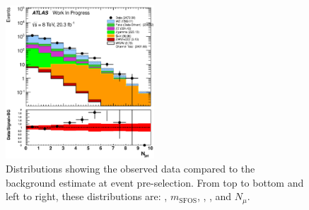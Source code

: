 \begin{figure}[htb]
\includegraphics[width=0.495\textwidth]{figures/appendix_signal_selection/Nov24Update_FakeSys_KFacSys_LogY_NoRebin/output/jobs/MxM/DataFull_Rates_May13_FakeRatesExactly2Loose_MuonMxMBJetGt0_ElBJetGt0SubtractPC_MxM/PreselectionNov23_15_physics/weight_all/eps/NJets_histratio.eps}
\caption{Distributions showing the observed data compared to the background estimate at event pre-selection.
From top to bottom and left to right, these distributions are: 
\deltaphi, $m_{\textrm{SFOS}}$, \njet, \nbjet, and $N_{\mu}$.
}
\label{fig:preselection2}
\end{figure}


